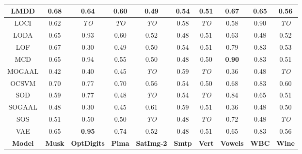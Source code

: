 \begin{table}[!t]
\begin{center}
\begin{small}
\begin{sc}
\begin{tabular}{|c|c|c|c|c|c|c|c|c|c|}
\hline
LMDD           &          0.68 &             0.64 &            0.60 &           0.49 &           0.54 &          0.51 &           0.67 &            0.65 &           0.56 \\
\hline
LOCI           &          0.62 &      \textit{TO} &     \textit{TO} &    \textit{TO} &           0.58 &   \textit{TO} &           0.58 &            0.90 &    \textit{TO} \\
\hline
LODA           &          0.65 &             0.93 &            0.60 &           0.52 &           0.48 &          0.51 &           0.63 &            0.48 &           0.52 \\
\hline
LOF            &          0.67 &             0.30 &            0.49 &           0.50 &           0.54 &          0.51 &           0.79 &            0.83 &           0.53 \\
\hline
MCD            &          0.65 &             0.94 &            0.55 &           0.50 &           0.48 &          0.50 &  \textbf{0.90} &            0.83 &           0.51 \\
\hline
MOGAAL         &          0.42 &             0.40 &            0.45 &    \textit{TO} &           0.59 &   \textit{TO} &           0.36 &            0.48 &    \textit{TO} \\
\hline
OCSVM          &          0.70 &             0.77 &            0.70 &           0.56 &           0.54 &          0.50 &           0.68 &            0.83 &           0.60 \\
\hline
SOD            &          0.59 &             0.77 &            0.48 &    \textit{TO} &           0.54 &   \textit{TO} &           0.84 &            0.65 &           0.51 \\
\hline
SOGAAL         &          0.48 &             0.30 &            0.45 &           0.61 &           0.59 &          0.51 &           0.36 &            0.48 &           0.50 \\
\hline
SOS            &          0.51 &             0.50 &            0.50 &    \textit{TO} &           0.48 &   \textit{TO} &           0.72 &            0.48 &    \textit{TO} \\
\hline
VAE            &          0.65 &    \textbf{0.95} &            0.74 &           0.52 &           0.48 &          0.51 &           0.65 &            0.83 &           0.56 \\
\hline
\hline
\textbf{Model} & \textbf{Musk} & \textbf{OptDigits} & \textbf{Pima} & \textbf{SatImg-2} & \textbf{Smtp} & \textbf{Vert} & \textbf{Vowels} & \textbf{WBC}  & \textbf{Wine} \\

\end{tabular}
\end{sc}
\end{small}
\end{center}
\end{table}
